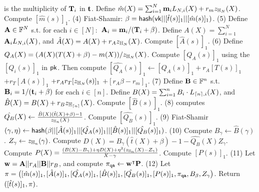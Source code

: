 \begin{footnotesize}
\begin{algorithm}[bt]
	is the multiplicity of ${{\mathbf {T}}}_i$ in ${{\mathbf {t}}}$. 
	Define $\hat{m}(X) = \sum_{i=1}^{N} {{\mathbf {m}}}_i L_{N,i}(X) + r_m z_{\mathbb{H}_{N}}(X)$. 
	Compute $[\hat{m}(s)]_1$. \newline
	(4) Fiat-Shamir: $\beta = \mathsf{hash}(\mathsf{vk} || [\hat{t}(s)]_1 || 
		[\hat{m}(s)]_1)$. \newline
	(5) Define ${{\mathbf {A}}} \in \mathbb{F}^{N}$ s.t. for each $i\in [N]:$
	${{\mathbf {A}}}_i = {{\mathbf {m}}}_i/({{\mathbf {T}}}_i + \beta)$.
	Define $A(X) = \sum_{i=1}^N$ ${{\mathbf {A}}}_i L_{N,i}(X)$,
	and $\hat{A}(X) = A(X) + r_A z_{\mathbb{H}_{N}}(X)$.
	Compute $[\hat{A}(s)]_1$. \newline
	(6) Define $Q_A(X) = (A(X) (T(X) + \beta) - m(X))/z_{\mathbb{H}_{N}}(X)$.
	Compute $[Q_A(s)]_1$ using the $[Q_i(s)]_1$ in $\mathsf{pk}$.
	Then compute $[\hat{Q_A}(s)]_1 \leftarrow [Q_A(s)]_1 + r_A[T(s)]_1$
		 $+ r_T[A(s)]_1$ $+ r_A r_T [z_{\mathbb{H}_{N}}(s)]_1$ $+ [r_A \beta -r_m]_1$.
	\newline
	(7)  Define ${{\mathbf {B}}} \in \mathbb{F}^n$ s.t. 
	${{\mathbf {B}}}_i = 1/({{\mathbf {t}}}_i + \beta)$ for each $i\in [n]$.
	Define $B(X) = \sum_{i=1}^n B_i \cdot L_{{\lceil{n}\rceil},i}(X)$, 
	and $\hat{B}(X) = B(X) + r_B z_{\mathbb{H}_{{\lceil{n}\rceil}}}(X)$.
	Compute $[\hat{B}(s)]_1$.
	\newline
	(8) computes $\hat{Q_B}(X) \leftarrow 
		\frac{\hat{B}(X)(\hat{t}(X) + \beta) - 1}{z_{\mathbb{H}_{n}}(X)}$.
	Compute $[\hat{Q_B}(s)]_1$. \newline
	(9) Fiat-Shamir $(\gamma, \eta) \leftarrow \mathsf{hash}(\beta ||
		[\hat{A}(s)]_1 ||	
		[\hat{Q_A}(s)]_1 ||	
		[\hat{B}(s)]_1 ||	
		[\hat{Q_B}(s)]_1)$. \newline
	(10) Compute 
	$B_\gamma \leftarrow \hat{B}(\gamma)$.
	$Z_\gamma \leftarrow z_{\mathbb{H}_{n}}(\gamma)$.
	Compute $D(X) = B_\gamma(\hat{t}(X) + \beta) - 
		1 - \hat{Q_B}(X)Z_\gamma$.
	Compute $P(X) = \frac{(B(X)-B_\gamma) + \eta D(X)+\eta^2(z_{\mathbb{H}_{n}}(X) - Z_\gamma)}{X-\gamma}$.
	Compute $[P(s)]_1$.
	\newline
	(11) Let ${{\mathbf {w}}} = {{\mathbf {A}}} || r_A || {{\mathbf {B}}} ||
		r_B$, and compute $\pi_{\texttt{qa}} \leftarrow {{\mathbf {w}}}^\intercal {{\mathbf {P}}}$.
	\newline
	(12) Let $\pi = \big(
				[\hat{m}(s)]_1, 
				[\hat{A}(s)]_1, 
				[\hat{Q_A}(s)]_1, 
				[\hat{B}(s)]_1, 
				[\hat{Q_B}(s)]_1, 
				[P(s)]_1, 
				\pi_{\texttt{qa}},
				B_\beta,
				Z_\gamma
			\big)$.
			Return $([\hat{t}(s)]_1, \pi)$.


\end{algorithm}
\end{footnotesize}
